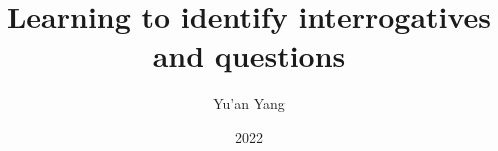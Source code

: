\documentclass[12pt]{umd-thesis}
\title{Learning to identify interrogatives and questions}
\author{Yu'an Yang}
\date{2022}
\begin{document}
\pagecolor{mygreen}

\frontmatter

\begin{abstract}
  
\end{abstract}

\maketitlepage

\makecopyrightpage

\begin{preface}

\end{preface}

\begin{acknowledgments}
  
\end{acknowledgments}

\tableofcontents\clearpage
\listoftables\clearpage
\listoffigures\clearpage
\begin{abbreviations}
  \renewcommand{\glossarysection}[2][]{}
  \printglossary[nonumberlist]
\end{abbreviations}


\mainmatter









\begin{appendices}
  
\end{appendices}



\backmatter

\printbibliography
\end{document}
